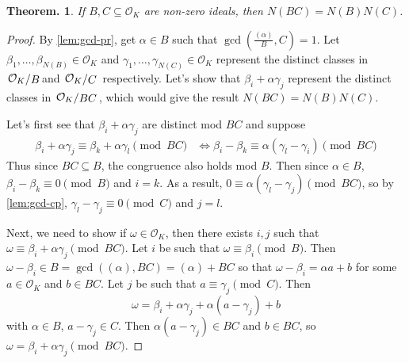\documentclass[11pt, a4paper]{memoir}
\theoremstyle{change}
\newtheorem{theorem}{Theorem.}[section]
\theoremstyle{plain}
\theoremstyle{nonumberplain}
\newtheorem{proof}{Proof}
\newcommand{\quot}[2]{\mathchoice{\left.\raisebox{0.13em}{$#1$}\middle/\raisebox{-0.13em}{$#2$}\right.}
                                 {\left.\raisebox{0.07em}{$#1$}\middle/\raisebox{-0.07em}{$#2$}\right.}
                                 {\left.\raisebox{0.03em}{$#1$}\middle/\raisebox{-0.03em}{$#2$}\right.}
                                 {\left.\raisebox{0em}{$#1$}\middle/\raisebox{0em}{$#2$}\right.}}
\numberwithin{equation}{section}
\begin{document}
\begin{theorem}
    If $B,C\subseteq\mathcal{O}_K$ are non-zero ideals, then $N(BC)=N(B)N(C)$.
\end{theorem}
\begin{proof}
    By \cref{lem:gcd-pr}, get $\alpha\in B$ such that $\gcd\left(\frac{(\alpha)}{B},C\right)=1$.
    Let $\beta_1,\ldots,\beta_{N(B)}\in\mathcal{O}_K$ and $\gamma_1,\ldots,\gamma_{N(C)}\in\mathcal{O}_K$ represent the distinct classes in $\quot{\mathcal{O}_K}{B}$and $\quot{\mathcal{O}_K}{C}$ respectively.
    Let's show that $\beta_i+\alpha\gamma_j$ represent the distinct classes in $\quot{\mathcal{O}_K}{BC}$, which would give the result $N(BC)=N(B)N(C)$.

    Let's first see that $\beta_i+\alpha\gamma_j$ are distinct mod $BC$ and suppose
    \begin{align*}
        \beta_i+\alpha\gamma_j \equiv\beta_k+\alpha\gamma_l\pmod{BC}&\iff \beta_i-\beta_k \equiv\alpha(\gamma_l-\gamma_i)\pmod{BC}
    \end{align*}
    Thus since $BC\subseteq B$, the congruence also holds mod $B$.
    Then since $\alpha\in B$, $\beta_i-\beta_k\equiv 0\pmod{B}$ and $i=k$.
    As a result, $0\equiv\alpha(\gamma_l-\gamma_j)\pmod{BC}$, so by \cref{lem:gcd-cp}, $\gamma_l-\gamma_j\equiv 0\pmod{C}$ and $j=l$.

    Next, we need to show if $\omega\in\mathcal{O}_K$, then there exists $i,j$ such that $\omega\equiv\beta_i+\alpha\gamma_j\pmod{BC}$.
    Let $i$ be such that $\omega\equiv\beta_i\pmod{B}$.
    Then $\omega-\beta_i\in B=\gcd((\alpha),BC)=(\alpha)+BC$ so that $\omega-\beta_i=\alpha a+b$ for some $a\in\mathcal{O}_K$ and $b\in BC$.
    Let $j$ be such that $a\equiv\gamma_j\pmod{C}$.
    Then
    \begin{equation*}
        \omega=\beta_i+\alpha\gamma_j+\alpha(a-\gamma_j)+b
    \end{equation*}
    with $\alpha\in B$, $a-\gamma_j\in C$.
    Then $\alpha(a-\gamma_j)\in BC$ and $b\in BC$, so $\omega=\beta_i+\alpha\gamma_j\pmod{BC}$.
\end{proof}
\end{document}
